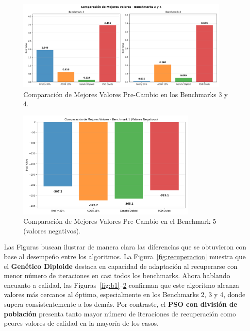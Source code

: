 \documentclass[10pt]{article}
\begin{document}
\begin{figure}[H]
    \centering
    \includegraphics[width=0.95\textwidth]{imagenes/b3_y_b4.png}
    \caption{Comparación de Mejores Valores Pre-Cambio en los Benchmarks 3 y 4.}
    \label{fig:b3b4}
\end{figure}

\begin{figure}[H]
    \centering
    \includegraphics[width=0.8\textwidth]{imagenes/b5.png}
    \caption{Comparación de Mejores Valores Pre-Cambio en el Benchmark 5 (valores negativos).}
    \label{fig:b5}
\end{figure}

Las Figuras buscan ilustrar de manera clara las diferencias que se obtuvieron con base al desempeño entre los algoritmos. La Figura~\ref{fig:recuperacion} muestra que el \textbf{Genético Diploide} destaca en capacidad de adaptación al recuperarse con menor número de iteraciones en casi todos los benchmarks. Ahora hablando encuanto a calidad, las Figuras~\ref{fig:b1}--\ref{fig:b5} confirman que este algoritmo alcanza valores más cercanos al óptimo, especialmente en los Benchmarks 2, 3 y 4, donde supera consistentemente a los demás. Por contraste, el \textbf{PSO con división de población} presenta tanto mayor número de iteraciones de recuperación como peores valores de calidad en la mayoría de los casos.
\end{document}

